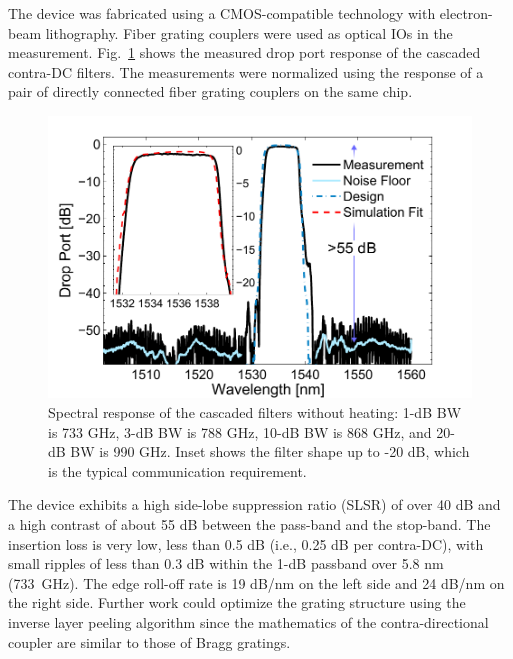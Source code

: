\documentclass[9pt,twocolumn,twoside]{osajnl}
\begin{document}

The device was fabricated using a CMOS-compatible technology with electron-beam lithography. 
Fiber grating couplers\cite{zhong2014focusingFGC} were used as optical IOs in the measurement. 
Fig.~\ref{fig:passive} shows the measured drop port response of the cascaded contra-DC filters. 
The measurements were normalized using the response of a pair of directly connected fiber grating couplers on the same chip.
\begin{figure}[htbp]
\centering
\includegraphics[width=.99\columnwidth]{data/Passive62}
\caption{ Spectral response of the cascaded filters without heating: 1-dB BW is 733 GHz, 3-dB BW is 788 GHz, 10-dB BW is 868 GHz, and 20-dB BW is 990 GHz. Inset shows the filter shape up to -20 dB, which is the typical communication requirement.}
\label{fig:passive}
\end{figure}

The device exhibits a high side-lobe suppression ratio (SLSR) of over 40 dB and a high contrast of about 55 dB between the pass-band and the stop-band. 
The insertion loss is very low, less than 0.5 dB (i.e., 0.25 dB per contra-DC), with small ripples of less than 0.3 dB within the 1-dB passband over 5.8 nm (733~GHz). 
The edge roll-off rate is 19 dB/nm on the left side and 24 dB/nm on the right side.
Further work could optimize the grating structure using the inverse layer peeling algorithm\cite{skaar2001synthesis} since the mathematics of the contra-directional coupler are similar to those of Bragg gratings.
\end{document}
